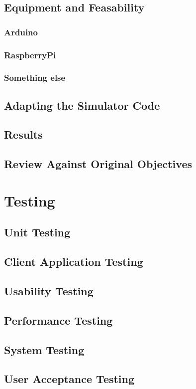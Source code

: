 \documentclass[12pt,a4paper,twoside]{report}
\begin{document}
	\section{Equipment and Feasability}
		\subsection{Arduino}
		\subsection{RaspberryPi}
		\subsection{Something else}
	\section{Adapting the Simulator Code}
	\section{Results}
	\section{Review Against Original Objectives}

\chapter{Testing}
	\section{Unit Testing}
	\section{Client Application Testing}
	\section{Usability Testing}
	\section{Performance Testing}
	\section{System Testing}
	\section{User Acceptance Testing}
\end{document}
